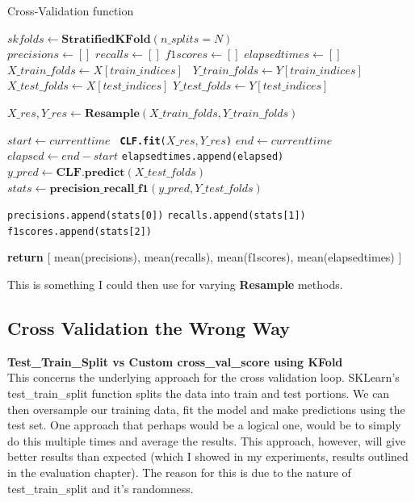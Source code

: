 \documentclass[12pt,a4paper,twoside]{report}
\begin{document}
\begin{algorithm}[H]
\caption{Cross-Validation function }\label{cross-val}
\begin{algorithmic}[1]

   \State $skfolds\gets \textbf{StratifiedKFold}(n\_splits = N)$\\
   
   \State $precisions\gets []$
   \State $recalls\gets []$
   \State $f1scores\gets []$
   \State $elapsedtimes\gets []$\\
   
        \State
         \texttt{\State $X\_train\_folds\gets X[train\_indices]$}
        \texttt{ \State $Y\_train\_folds\gets Y[train\_indices]$}
        \texttt{ \State $X\_test\_folds\gets X[test\_indices]$}
         \texttt{\State $Y\_test\_folds\gets Y[test\_indices]$}
         
         \texttt{\State $X\_res, Y\_res \gets \textbf{Resample}(X\_train\_folds,Y\_train\_folds)$}
         
          \texttt{\State $ start \gets current time$} 
          \texttt{ \State \textbf{CLF.fit}($X\_res, Y\_res$)} 
          \texttt{\State $ end \gets current time$} 
          \texttt{\State $ elapsed \gets end - start$} 
          \texttt{\State elapsedtimes.append(elapsed)} 
           \texttt{\State $y\_pred \gets \textbf{CLF.predict}(X\_test\_folds)$} 
          \texttt{\State $stats \gets \textbf{precision\_recall\_f1}(y\_pred, Y\_test\_folds )$} 
          
          \texttt{\State precisions.append(stats[0])}
          \texttt{\State recalls.append(stats[1])}  
          \texttt{\State f1scores.append(stats[2])} 
   \EndFor
   
   \State \textbf{return} [ mean(precisions), mean(recalls), mean(f1scores), mean(elapsedtimes) ]
   
\EndProcedure
\end{algorithmic}
\end{algorithm}

This is something I could then use for varying \textbf{Resample} methods. 

\subsection{Cross Validation the Wrong Way}

\textbf{Test\_Train\_Split vs Custom cross\_val\_score using KFold}\\
This concerns the underlying approach for the cross validation loop. SKLearn's test\_train\_split function splits the data into train and test portions. We can then oversample our training data, fit the model and make predictions using the test set.
One approach that perhaps would be a logical one, would be to simply do this multiple times and average the results.
This approach, however, will give better results than expected (which I showed in my experiments, results outlined in the evaluation chapter). The reason for this is due to the nature of test\_train\_split and it's randomness.
\end{document}
